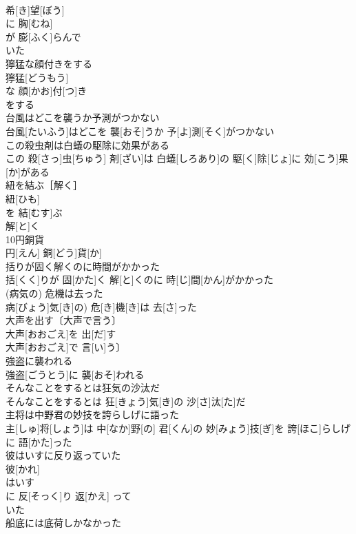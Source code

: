 \documentclass[8pt]{extreport}
\begin{document}
\begin{CJK}{UTF8}{min}
\\	希[き]望[ぼう]
\\	に 胸[むね]
\\	が 膨[ふく]らんで 
\\	いた 
\\	獰猛な顔付きをする	
\\	獰猛[どうもう]
\\	な 顔[かお]付[つ]き 
\\	をする 
\\	台風はどこを襲うか予測がつかない	
\\	台風[たいふう]はどこを 襲[おそ]うか 予[よ]測[そく]がつかない
\\	この殺虫剤は白蟻の駆除に効果がある	
\\	この 殺[さっ]虫[ちゅう] 剤[ざい]は 白蟻[しろあり]の 駆[く]除[じょ]に 効[こう]果[か]がある
\\	紐を結ぶ［解く］	
\\	紐[ひも]
\\	を 結[むす]ぶ 
\\	解[と]く 
\\	10円銅貨	
\\	円[えん] 銅[どう]貨[か]
\\	括りが固く解くのに時間がかかった	
\\	括[くく]りが 固[かた]く 解[と]くのに 時[じ]間[かん]がかかった
\\	(病気の) 危機は去った	
\\	病[びょう]気[き]の) 危[き]機[き]は 去[さ]った
\\	大声を出す〔大声で言う〕	
\\	大声[おおごえ]を 出[だ]す
\\	大声[おおごえ]で 言[い]う〕
\\	強盗に襲われる	
\\	強盗[ごうとう]に 襲[おそ]われる
\\	そんなことをするとは狂気の沙汰だ	
\\	そんなことをするとは 狂[きょう]気[き]の 沙[さ]汰[た]だ
\\	主将は中野君の妙技を誇らしげに語った	
\\	主[しゅ]将[しょう]は 中[なか]野[の] 君[くん]の 妙[みょう]技[ぎ]を 誇[ほこ]らしげに 語[かた]った
\\	彼はいすに反り返っていた	
\\	彼[かれ]
\\	はいす 
\\	に 反[そっく]り 返[かえ] って 
\\	いた 
\\	船底には底荷しかなかった	

\end{CJK}
\end{document}
